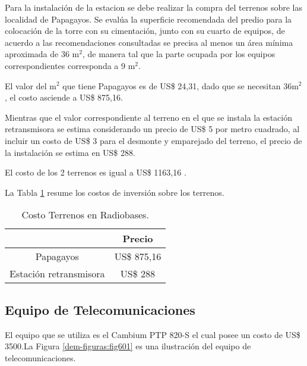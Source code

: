 Para la instalación de la estacion se debe realizar la compra del terrenos sobre las localidad de Papagayos. Se evalúa la superficie recomendada del predio para la colocación de la torre con su cimentación, junto con su cuarto de equipos, de acuerdo a las recomendaciones consultadas se precisa al menos un área mínima aproximada de 36 m$^{2}$, de manera tal que la parte ocupada por los equipos correspondientes corresponda a 9 m$^{2}$\cite{recomendacion}.

El valor del m$^{2}$ que tiene Papagayos es de US\$  24,31, dado que se necesitan 36m$^{2}$, el costo asciende a US\$  875,16.


Mientras que el valor correspondiente al terreno en el que se instala la estación retransmisora se estima considerando un precio de US\$  5 por metro cuadrado, al incluir un costo de US\$  3 \cite{terreno3} para el desmonte y emparejado del terreno, el precio de la instalación se estima en US\$  288.

El costo de los 2 terrenos es igual a US\$  1163,16 \cite{terreno1}\cite{terreno3}.


La Tabla \ref{tab:terrenos} resume los costos de inversión sobre los terrenos.

\begin{table}[H]
  \centering  
    \begin{tabular}{|c|c|}
    \hline
    \rowcolor[HTML]{C5D9F1}{\textbf{Ubicación}} & {\textbf{Precio}} \bigstrut\\
    \hline
    Papagayos & US\$  875,16 \bigstrut\\
    \hline
    Estación retransmisora & US\$  288 \bigstrut\\
    \hline
    \end{tabular}%
    \caption{Costo Terrenos en Radiobases.}
  \label{tab:terrenos}%
\end{table}%




\subsection{Equipo de Telecomunicaciones}

El equipo que se utiliza es el Cambium PTP 820-S el cual posee un costo de US\$ 3500.La Figura \ref{dem-figuras:fig601} es una ilustración del equipo de telecomunicaciones. 


